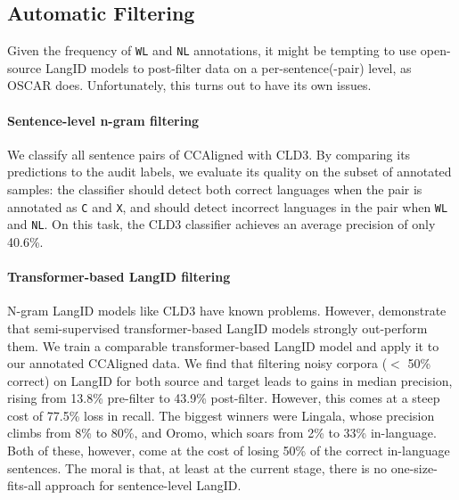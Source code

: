 \subsection{Automatic Filtering}
Given the frequency of \texttt{WL} and \texttt{NL} annotations, it might be tempting to use open-source LangID models to post-filter data on a per-sentence(-pair) level, as OSCAR does. Unfortunately, this turns out to have its own issues.

\paragraph{Sentence-level n-gram filtering}
We classify all sentence pairs of CCAligned with CLD3. By comparing its predictions to the audit labels, we evaluate its quality on the subset of annotated samples: the classifier should detect both correct languages when the pair is annotated as \texttt{C} and \texttt{X}, and should detect incorrect languages in the pair when \texttt{WL} and \texttt{NL}. On this task, the CLD3 classifier
achieves an average precision of only 40.6\%. %

\paragraph{Transformer-based LangID filtering}
N-gram LangID models like CLD3 have known problems. However, \citet{caswell-etal-2020-language} demonstrate that semi-supervised transformer-based LangID models strongly out-perform them. We train a comparable transformer-based LangID model and apply it to our annotated CCAligned data. We find that filtering noisy corpora ($<$ 50\% correct) on LangID for both source and target leads to gains in median precision, rising from 13.8\% pre-filter to 43.9\% post-filter. However, this comes at a steep cost of 77.5\% loss in recall.
The biggest winners were Lingala, whose precision climbs from 8\% to 80\%, and Oromo, which soars from 2\% to 33\% in-language. Both of these, however, come at the cost of losing 50\% of the correct in-language sentences. The moral is that, at least at the current stage, there is no one-size-fits-all approach for sentence-level LangID.


